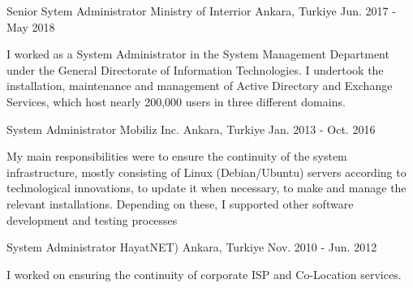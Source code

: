 \begin{cventries}
  \cventry
    {Senior Sytem Administrator} %
    {Ministry of Interrior} %
    {Ankara, Turkiye} %
    {Jun. 2017 - May 2018} %
    {
      \begin{cvitems} %
        \item {I worked as a System Administrator in the System Management Department under the General Directorate of Information Technologies. I undertook the installation, maintenance and management of Active Directory and Exchange Services, which host nearly 200,000 users in three different domains.}
        \end{cvitems}
    }

  \cventry
    {System Administrator} %
    {Mobiliz Inc.} %
    {Ankara, Turkiye} %
    {Jan. 2013 - Oct. 2016} %
    {
      \begin{cvitems} %
        \item {My main responsibilities were to ensure the continuity of the system infrastructure, mostly consisting of Linux (Debian/Ubuntu) servers according to technological innovations, to update it when necessary, to make and manage the relevant installations. Depending on these, I supported other software development and testing processes}
      \end{cvitems}
    }

  \cventry
    {System Administrator} %
    {HayatNET)} %
    {Ankara, Turkiye} %
    {Nov. 2010 - Jun. 2012} %
    {
      \begin{cvitems} %
        \item {I worked on ensuring the continuity of corporate ISP and Co-Location services.}
      \end{cvitems}
    }


\end{cventries}
